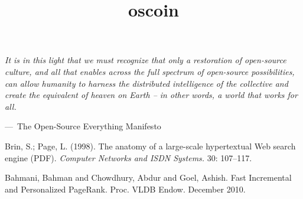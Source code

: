 \documentclass[a4paper, oneside, 9pt, draft]{amsart}
\makeatletter
\newenvironment{epigraph}[2][]
{\leftskip=1cm \def\epigraph@author{#2} \smallskip\itshape}
{\par\vspace{0.5em}\normalfont\hfill---\ \epigraph@author\hspace*{0.2cm}\par\medskip}
\makeatother
\begin{document}
\title{oscoin}

\maketitle

\setlength{\columnsep}{20pt}
\begin{multicols}{2}

\begin{epigraph}{The Open-Source Everything Manifesto}
    \noindent It is in this light that we must recognize that only a restoration of
    open-source culture, and all that enables across the full spectrum of
    open-source possibilities, can allow humanity to harness the distributed
    intelligence of the collective and create the equivalent of heaven on Earth
    -- in other words, a world that works for all.
\end{epigraph}
\medskip




%

\end{multicols}

\begin{thebibliography}{9}

 Brin, S.; Page, L. (1998). The anatomy of a
  large-scale hypertextual Web search engine (PDF). \emph{Computer Networks
  and ISDN Systems.} 30: 107–117.

 Bahmani, Bahman and Chowdhury, Abdur and Goel,
  Ashish. Fast Incremental and Personalized PageRank. Proc. VLDB
  Endow. December 2010.

\end{thebibliography}
\end{document}
